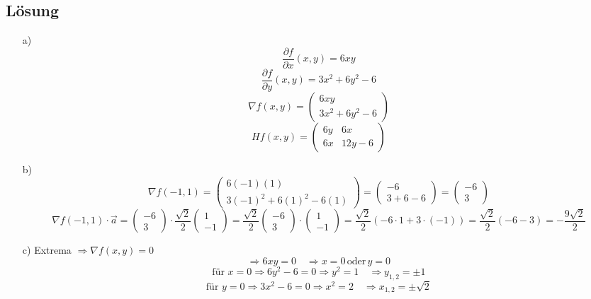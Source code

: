 \documentclass[a4paper, ngerman, 11pt]{article}
\begin{document}
	\subsection*{Lösung}
	\begin{enumerate}
		\item[a)]
		\[
		\frac{\partial f}{\partial x}(x,y) = 6xy
		\]
		\[
		\frac{\partial f}{\partial y}(x,y) = 3x^2 + 6y^2 - 6
		\]
		\[
		\nabla f(x,y) = \begin{pmatrix} 6xy \\ 3x^2 + 6y^2 - 6 \end{pmatrix}
		\]
		\[
		Hf(x,y) = \begin{pmatrix}
			6y & 6x \\
			6x & 12y - 6
		\end{pmatrix}
		\]
		
		\item[b)]
		\[
		\nabla f(-1,1) = \begin{pmatrix} 6(-1)(1) \\ 3(-1)^2 + 6(1)^2 - 6(1) \end{pmatrix} = \begin{pmatrix} -6 \\ 3 + 6 - 6 \end{pmatrix} = \begin{pmatrix} -6 \\ 3 \end{pmatrix}
		\]
		\[
		\nabla f(-1,1) \cdot \vec{a} = \begin{pmatrix} -6 \\ 3 \end{pmatrix} \cdot \frac{\sqrt{2}}{2} \begin{pmatrix} 1 \\ -1 \end{pmatrix} = \frac{\sqrt{2}}{2} \begin{pmatrix} -6 \\ 3 \end{pmatrix} \cdot \begin{pmatrix} 1 \\ -1 \end{pmatrix} = \frac{\sqrt{2}}{2} (-6 \cdot 1 + 3 \cdot (-1)) = \frac{\sqrt{2}}{2} (-6 - 3) = -\frac{9\sqrt{2}}{2}
		\]
		
		\item[c)] Extrema $\Rightarrow \nabla f(x,y) = 0$
		\[
		\Rightarrow 6xy = 0 \quad \Rightarrow x = 0 \, \text{oder} \, y = 0
		\]
		\[
		\text{für } x = 0\Rightarrow 6y^2 - 6 = 0 \Rightarrow y^2 = 1 \quad \Rightarrow y_{1,2} = \pm 1
		\]
		\[
		\text{für } y = 0 \Rightarrow 3x^2 -6 = 0 \Rightarrow x^2 = 2 \quad \Rightarrow x_{1,2} = \pm\sqrt{2}
		\]
		

\end{enumerate}
\end{document}
